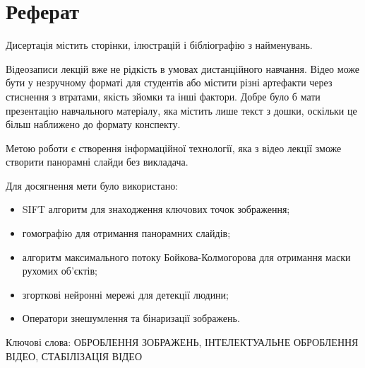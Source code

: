 \chapter*{Реферат}

Дисертація містить
\pageref{LastPage}
сторінки,
ілюстрацій
і бібліографію з
найменувань.

Відеозаписи лекцій вже не рідкість в умовах дистанційного навчання.
Відео може бути у незручному форматі для студентів або містити різні артефакти
через стиснення з втратами, якість зйомки та  інші фактори. Добре було б мати
презентацію навчального матеріалу, яка містить лише текст з дошки,
оскільки це більш наближено до формату конспекту.

Метою роботи є створення інформаційної технології, яка з відео лекції
зможе створити панорамні слайди без викладача.

Для досягнення мети було використано:
\begin{itemize}
  \item
        SIFT алгоритм для знаходження ключових точок зображення;
  \item   
        гомографію для отримання панорамних слайдів;
  \item
        алгоритм максимального потоку Бойкова-Колмогорова
        для отримання маски рухомих об'єктів;
  \item
        згорткові нейронні мережі для детекції людини;
  \item
        Оператори знешумлення та бінаризації зображень.
\end{itemize}

Ключові слова:
\MakeUppercase{оброблення зображень, інтелектуальне оброблення відео,
  стабілізація відео}
